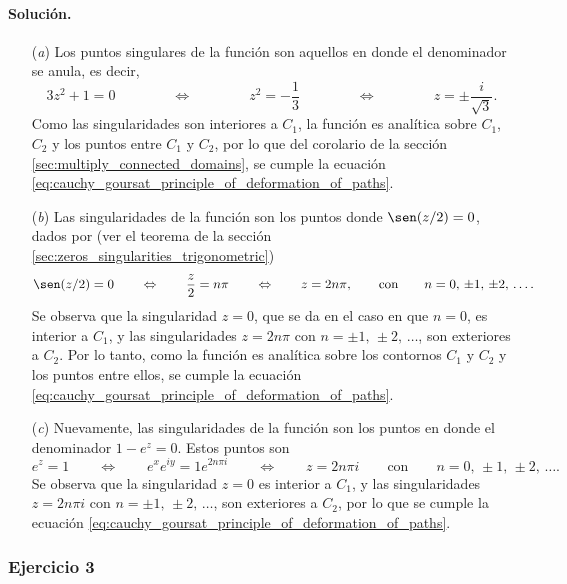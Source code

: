 \documentclass[a4paper]{report}
\begin{document}
\paragraph{Solución.} 
\begin{enumerate}
 \item[(\textit{a})] Los puntos singulares de la función son aquellos en donde el denominador se anula, es decir,
 \[
  3z^2+1=0
  \qquad\qquad\Leftrightarrow\qquad\qquad
  z^2=-\frac{1}{3}
  \qquad\qquad\Leftrightarrow\qquad\qquad
  z=\pm\frac{i}{\sqrt{3}}.
 \]
 Como las singularidades son interiores a \(C_1\), la función es analítica sobre \(C_1\), \(C_2\) y los puntos entre \(C_1\) y \(C_2\), por lo que del corolario de la sección \ref{sec:multiply_connected_domains}, se cumple la ecuación \ref{eq:cauchy_goursat_principle_of_deformation_of_paths}.
 \item[(\textit{b})] Las singularidades de la función son los puntos donde \(\sen(z/2)=0\), dados por (ver el teorema de la sección \ref{sec:zeros_singularities_trigonometric})
 \[
  \sen(z/2)=0
  \qquad\Leftrightarrow\qquad
  \frac{z}{2}=n\pi
  \qquad\Leftrightarrow\qquad
  z=2n\pi,
  \qquad\textrm{con}\qquad 
  n=0,\,\pm1,\,\pm2,\,\dots.
 \]
 Se observa que la singularidad \(z=0\), que se da en el caso en que \(n=0\), es interior a \(C_1\), y las singularidades \(z=2n\pi\) con \(n=\pm1,\,\pm2,\,\dots\), son exteriores a \(C_2\). Por lo tanto, como la función es analítica sobre los contornos \(C_1\) y \(C_2\) y los puntos entre ellos, se cumple la ecuación \ref{eq:cauchy_goursat_principle_of_deformation_of_paths}.
 \item[(\textit{c})] Nuevamente, las singularidades de la función son los puntos en donde el denominador \(1-e^z=0\). Estos puntos son
 \[
  e^z=1
  \qquad\Leftrightarrow\qquad
  e^xe^{iy}=1e^{2n\pi i}
  \qquad\Leftrightarrow\qquad
  z=2n\pi i
  \qquad\textrm{con}\qquad 
  n=0,\,\pm1,\,\pm2,\,\dots.
 \]
 Se observa que la singularidad \(z=0\) es interior a \(C_1\), y las singularidades \(z=2n\pi i\) con \(n=\pm1,\,\pm2,\,\dots\), son exteriores a \(C_2\), por lo que se cumple la ecuación \ref{eq:cauchy_goursat_principle_of_deformation_of_paths}.
\end{enumerate}

\subsubsection*{Ejercicio 3}
\end{document}
